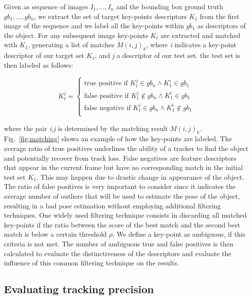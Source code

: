 Given as sequence of images $I_{1},...,I_{n}$ and the bounding box ground truth $gb_{1},...,gb_{n}$, we extract the set of target key-points descriptors $K_{1}$ from the first image of the sequence and we label all the key-points within $gb_{1}$ as descriptors of the object. For any subsequent image key-points $K_{t}$ are extracted and matched with $K_{1}$, generating a list of matches $M(i,j)_{k}$, where \textit{i} indicates a key-point descriptor of our target set $K_{1}$, and \textit{j} a descriptor of our test set. the test set is then labeled as follows:

\begin{equation}
K_{t}^{j} = 
\begin{cases}
\text{true positive}  \text{ if } K_{t}^{j} \in gb_{n} \land K_{1}^{i} \in gb_{1} \\
\text{false positive}  \text{ if } K_{t}^{j} \notin gb_{n} \land K_{1}^{i} \in gb_{1} \\
\text{false negative}  \text{ if } K_{t}^{j} \in gb_{n} \land K_{1}^{i} \notin gb_{1} \\
\end{cases}
\end{equation}

where the pair \textit{i,j} is determined by the matching result $M(i,j)_{k}$. Fig.~\ref{fig:matching} shows an example of how the key-points are labeled. The average ratio of true positives underlines the ability of a tracker to find the object and potentially recover from track loss. False negatives are feature descriptors that appear in the current frame but have no corresponding match in the initial test set $K_{1}$. This may happen due to drastic change in appearance of the object. The ratio of false positives is very important to consider since it indicates the average number of outliers that will be used to estimate the pose of the object, resulting in a bad pose estimation without employing additional filtering techniques. One widely used filtering technique consists in discarding all matched key-points if the ratio between the score of the best match and the second best match is below a certain threshold $\rho$. We define a key-point as ambiguous, if this criteria is not met. The  number of ambiguous true and false positives is then calculated to evaluate the distinctiveness of the descriptors and evaluate the influence of this common filtering technique on the results.

\subsection{Evaluating tracking precision}
\label{sec:accuracy}

